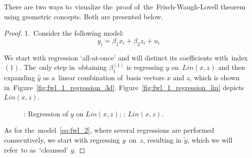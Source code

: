 There are two ways to~visualize the~proof of~the~Frisch-Waugh-Lovell theorem
using geometric concepts. Both are presented below.

\begin{proof}
1.~Consider the following model:
\begin{equation} \label{eq:fwl_proof}
y_i = \beta_1 x_i + \beta_2 z_i + u_i
\end{equation}

We start with regression `all-at-once' and will distinct its coefficients with~index $(1)$.
The~only step in~obtaining $\beta_1^{(1)}$ is regressing $y$ on~$Lin(x,z)$ and
then expanding $\hat y$ as a~linear combination of~basis vectors $x$ and $z$,
which is shown in~Figure~\ref{fig:fwl_1_regression_3d}. Figure~\ref{fig:fwl_1_regression_lin}
depicts $Lin(x, z)$.

\begin{figure}[ht!]
\begin{center}
\hspace{4ex}
\caption{: Regression of $y$ on $Lin(x,z)$; : $Lin(x, z)$.}
\end{center}
\end{figure}

As for the~model~\ref{eq:fwl_2}, where several regressions are performed consecutively,
we start with regressing $y$~on~$z$, resulting in $\tilde{y}$,
which we will refer~to as~`cleansed' $y$.


\end{proof}
